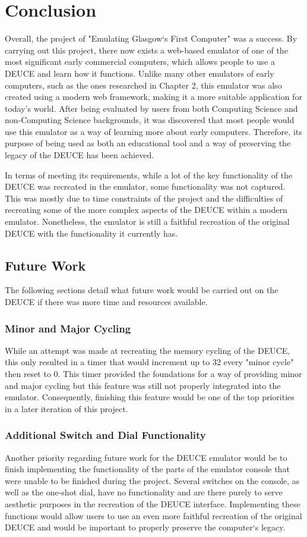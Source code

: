 \documentclass{l4proj}
\begin{document}
\chapter{Conclusion}    
Overall, the project of "Emulating Glasgow`s First Computer" was a success. By carrying out this project, there now exists a web-based emulator of one of the most significant early commercial computers, which allows people to use a DEUCE and learn how it functions. Unlike many other emulators of early computers, such as the ones researched in Chapter 2, this emulator was also created using a modern web framework, making it a more suitable application for today's world. After being evaluated by users from both Computing Science and non-Computing Science backgrounds, it was discovered that most people would use this emulator as a way of learning more about early computers. Therefore, its purpose of being used as both an educational tool and a way of preserving the legacy of the DEUCE has been achieved. 

In terms of meeting its requirements, while a lot of the key functionality of the DEUCE was recreated in the emulator, some functionality was not captured. This was mostly due to time constraints of the project and the difficulties of recreating some of the more complex aspects of the DEUCE within a modern emulator. Nonetheless, the emulator is still a faithful recreation of the original DEUCE with the functionality it currently has.

\section{Future Work}
The following sections detail what future work would be carried out on the DEUCE if there was more time and resources available.

\subsection{Minor and Major Cycling}
While an attempt was made at recreating the memory cycling of the DEUCE, this only resulted in a timer that would increment up to 32 every "minor cycle" then reset to 0. This timer provided the foundations for a way of providing minor and major cycling but this feature was still not properly integrated into the emulator. Consequently, finishing this feature would be one of the top priorities in a later iteration of this project.

\subsection{Additional Switch and Dial Functionality}
Another priority regarding future work for the DEUCE emulator would be to finish implementing the functionality of the parts of the emulator console that were unable to be finished during the project. Several switches on the console, as well as the one-shot dial, have no functionality and are there purely to serve aesthetic purposes in the recreation of the DEUCE interface. Implementing these functions would allow users to use an even more faithful recreation of the original DEUCE and would be important to properly preserve the computer`s legacy.
\end{document}
